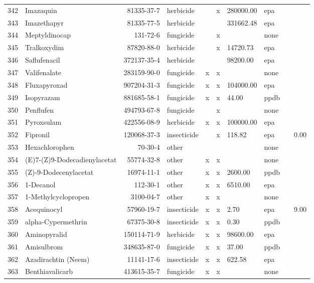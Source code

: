 \begin{longtable}{lp{3cm}rlp{0.5cm}p{0.5cm}p{1.5cm}p{1cm}p{1cm}p{1cm}}
  342 & Imazaquin & 81335-37-7 & herbicide &  & x & 280000.00 & epa &  &  \\ 
  343 & Imazethapyr & 81335-77-5 & herbicide &  &  & 331662.48 & epa &  &  \\ 
  344 & Meptyldinocap & 131-72-6 & fungicide &  & x &  & none &  &  \\ 
  345 & Tralkoxydim & 87820-88-0 & herbicide &  & x & 14720.73 & epa &  &  \\ 
  346 & Saflufenacil & 372137-35-4 & herbicide &  &  & 98200.00 & epa &  &  \\ 
  347 & Valifenalate & 283159-90-0 & fungicide & x & x &  & none &  &  \\ 
  348 & Fluxapyroxad & 907204-31-3 & fungicide & x & x & 104000.00 & epa &  &  \\ 
  349 & Isopyrazam & 881685-58-1 & fungicide & x & x & 44.00 & ppdb &  &  \\ 
  350 & Penflufen & 494793-67-8 & fungicide &  & x &  & none &  &  \\ 
  351 & Pyroxsulam & 422556-08-9 & herbicide & x & x & 100000.00 & epa &  &  \\ 
  352 & Fipronil & 120068-37-3 & insecticide &  & x & 118.82 & epa &  & 0.00 \\ 
  353 & Hexachlorophen & 70-30-4 & other &  &  &  & none &  &  \\ 
  354 & (E)7-(Z)9-Dodecadienylacetat & 55774-32-8 & other & x & x &  & none &  &  \\ 
  355 & (Z)-9-Dodecenylacetat & 16974-11-1 & other & x & x & 2600.00 & ppdb &  &  \\ 
  356 & 1-Decanol & 112-30-1 & other & x & x & 6510.00 & epa &  &  \\ 
  357 & 1-Methylcyclopropen & 3100-04-7 & other & x & x &  & none &  &  \\ 
  358 & Acequinocyl & 57960-19-7 & insecticide & x & x & 2.70 & epa &  & 9.00 \\ 
  359 & alpha-Cypermethrin & 67375-30-8 & insecticide & x & x & 0.30 & ppdb &  &  \\ 
  360 & Aminopyralid & 150114-71-9 & herbicide & x & x & 98600.00 & epa &  &  \\ 
  361 & Amisulbrom & 348635-87-0 & fungicide & x & x & 37.00 & ppdb &  &  \\ 
  362 & Azadirachtin (Neem) & 11141-17-6 & insecticide & x & x & 622.58 & epa &  &  \\ 
  363 & Benthiavalicarb & 413615-35-7 & fungicide & x & x &  & none &  &  \\ 

\end{longtable}
